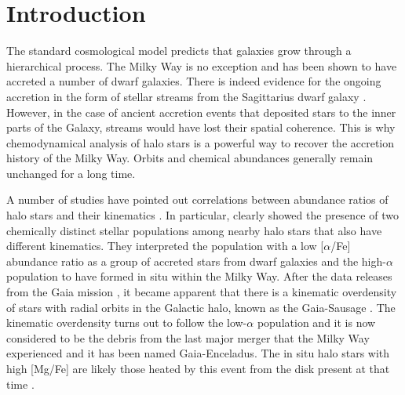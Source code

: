 \documentclass{aa}
\begin{document}
\section{Introduction\label{sec:intro}}


The standard cosmological model predicts that galaxies grow through a hierarchical process.
The Milky Way is no exception and has been shown to have accreted a number of dwarf galaxies.
There is indeed evidence for the ongoing accretion in the form of stellar streams from the Sagittarius dwarf galaxy \citep[e.g.,][]{Ibata1994a,Belokurov2006a,Grillmair2006a,Bernard2016,Malhan2018a,Ramos2020a,Antoja2020a}.
However, in the case of ancient accretion events that deposited stars to the inner parts of the Galaxy, streams would have lost their spatial coherence.
This is why chemodynamical analysis of halo stars is a powerful way to recover the accretion history of the Milky Way.
Orbits and chemical abundances generally remain unchanged for a long time.

A number of studies have pointed out correlations between abundance ratios of halo stars and their kinematics \citep[e.g.,][]{Nissen1997a,Gratton2003a,Venn2004a,Nissen2010,Ishigaki2012}.
In particular, \citet[][hereafter NS10]{Nissen2010} clearly showed the presence of two chemically distinct stellar populations among nearby halo stars that also have different kinematics.
They interpreted the population with a low [$\alpha$/{Fe}] abundance ratio as a group of accreted stars from dwarf galaxies and the high-$\alpha$ population to have formed in situ within the Milky Way.
After the data releases from the Gaia mission \citep{GaiaCollaboration2016a,GaiaCollaboration2018a}, it became apparent that there is a kinematic overdensity of stars with radial orbits in the Galactic halo, known as the Gaia-Sausage \citep[e.g.,][]{Belokurov2018a,Koppelman2018a}.
The kinematic overdensity turns out to follow the low-$\alpha$ population \citep[e.g.,][]{Helmi2018a,Haywood2018a,Mackereth2019a,Hasselquist2021a} and it is now considered to be the debris from the last major merger that the Milky Way experienced and it has been named Gaia-Enceladus.
The in situ halo stars with high [{Mg}/{Fe}] are likely those heated by this event from the disk present at that time \citep{Helmi2018a,Belokurov2020a,Gallart2019a,DiMatteo2019a}.
\end{document}
